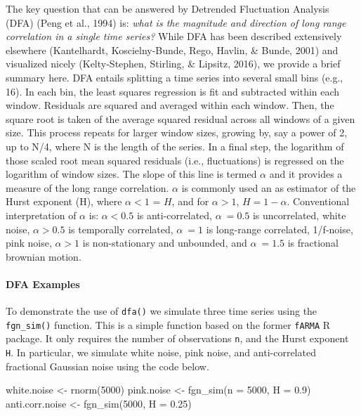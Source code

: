 \documentclass[
  english,
  man]{apa6}
\newenvironment{Shaded}{\begin{snugshade}}{\end{snugshade}}
\newcommand{\AttributeTok}[1]{\textcolor[rgb]{0.77,0.63,0.00}{#1}}
\newcommand{\DecValTok}[1]{\textcolor[rgb]{0.00,0.00,0.81}{#1}}
\newcommand{\FloatTok}[1]{\textcolor[rgb]{0.00,0.00,0.81}{#1}}
\newcommand{\FunctionTok}[1]{\textcolor[rgb]{0.00,0.00,0.00}{#1}}
\newcommand{\NormalTok}[1]{#1}
\newcommand{\OtherTok}[1]{\textcolor[rgb]{0.56,0.35,0.01}{#1}}
\let\oldparagraph\paragraph
\renewcommand{\paragraph}[1]{\oldparagraph{#1}\mbox{}}
\begin{document}
The key question that can be answered by Detrended Fluctuation Analysis
(DFA) (Peng et al., 1994) is: \emph{what is the magnitude and
direction of long range correlation in a single time series?} While DFA
has been described extensively elsewhere
(Kantelhardt, Koscielny-Bunde, Rego, Havlin, \& Bunde, 2001) and visualized nicely
(Kelty-Stephen, Stirling, \& Lipsitz, 2016), we provide a brief
summary here. DFA entails splitting a time series into several small
bins (e.g., 16). In each bin, the least squares regression is fit and
subtracted within each window. Residuals are squared and averaged within
each window. Then, the square root is taken of the average squared
residual across all windows of a given size. This process repeats for
larger window sizes, growing by, say a power of 2, up to N/4, where N is
the length of the series. In a final step, the logarithm of those scaled
root mean squared residuals (i.e., fluctuations) is regressed on the
logarithm of window sizes. The slope of this line is termed \(\alpha\) and
it provides a measure of the long range correlation. \(\alpha\) is
commonly used an as estimator of the Hurst exponent (H), where
\(\alpha<1\) = \(H\), and for \(\alpha>1\), \(H = 1 - \alpha\). Conventional
interpretation of \(\alpha\) is: \(\alpha < 0.5\) is anti-correlated,
\(\alpha ~= 0.5\) is uncorrelated, white noise, \(\alpha > 0.5\) is
temporally correlated, \(\alpha ~= 1\) is long-range correlated,
1/f-noise, pink noise, \(\alpha > 1\) is non-stationary and unbounded, and
\(\alpha ~= 1.5\) is fractional brownian motion.

\hypertarget{dfa-examples}{%
\paragraph{DFA Examples}\label{dfa-examples}}

To demonstrate the use of \texttt{dfa()} we simulate three time series using
the \texttt{fgn\_sim()} function. This is a simple function based on the former
\texttt{fARMA} R package. It only requires the number of observations \texttt{n}, and
the Hurst exponent \texttt{H}. In particular, we simulate white noise, pink
noise, and anti-correlated fractional Gaussian noise using the code
below.

\begin{Shaded}
\begin{Highlighting}[]
\NormalTok{white.noise }\OtherTok{\textless{}{-}} \FunctionTok{rnorm}\NormalTok{(}\DecValTok{5000}\NormalTok{)}
\NormalTok{pink.noise }\OtherTok{\textless{}{-}} \FunctionTok{fgn\_sim}\NormalTok{(}\AttributeTok{n =} \DecValTok{5000}\NormalTok{, }\AttributeTok{H =} \FloatTok{0.9}\NormalTok{)}
\NormalTok{anti.corr.noise }\OtherTok{\textless{}{-}} \FunctionTok{fgn\_sim}\NormalTok{(}\DecValTok{5000}\NormalTok{, }\AttributeTok{H =} \FloatTok{0.25}\NormalTok{)}
\end{Highlighting}
\end{Shaded}
\end{document}
